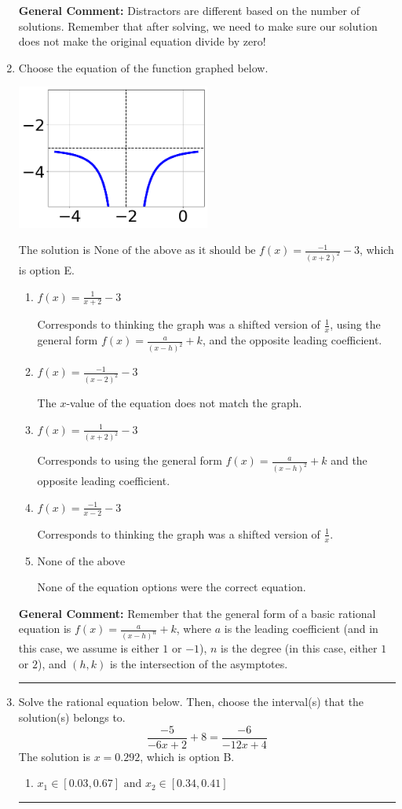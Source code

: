 \documentclass{extbook}[14pt]
\newcommand{\litem}[1]{\item #1

\rule{\textwidth}{0.4pt}}
\begin{document}
\begin{enumerate}
{\textbf{General Comment:} Distractors are different based on the number of solutions. Remember that after solving, we need to make sure our solution does not make the original equation divide by zero!
}
\litem{
Choose the equation of the function graphed below.

\begin{center}
    \includegraphics[width=0.5\textwidth]{../Figures/rationalGraphToEquationCopyC.png}
\end{center}


The solution is \( \text{None of the above as it should be } f(x) = \frac{-1}{(x + 2)^2} - 3 \), which is option E.\begin{enumerate}[label=\Alph*.]
\item \( f(x) = \frac{1}{x + 2} - 3 \)

Corresponds to thinking the graph was a shifted version of $\frac{1}{x}$, using the general form $f(x) = \frac{a}{(x-h)^2}+k$, and the opposite leading coefficient.
\item \( f(x) = \frac{-1}{(x - 2)^2} - 3 \)

The $x$-value of the equation does not match the graph.
\item \( f(x) = \frac{1}{(x + 2)^2} - 3 \)

Corresponds to using the general form $f(x) = \frac{a}{(x-h)^2}+k$ and the opposite leading coefficient.
\item \( f(x) = \frac{-1}{x - 2} - 3 \)

Corresponds to thinking the graph was a shifted version of $\frac{1}{x}$.
\item \( \text{None of the above} \)

None of the equation options were the correct equation.
\end{enumerate}

\textbf{General Comment:} Remember that the general form of a basic rational equation is $ f(x) = \frac{a}{(x-h)^n} + k$, where $a$ is the leading coefficient (and in this case, we assume is either $1$ or $-1$), $n$ is the degree (in this case, either $1$ or $2$), and $(h, k)$ is the intersection of the asymptotes.
}
\litem{
Solve the rational equation below. Then, choose the interval(s) that the solution(s) belongs to.
\[ \frac{-5}{-6x + 2} + 8 = \frac{-6}{-12x + 4} \]The solution is \( x = 0.292 \), which is option B.\begin{enumerate}[label=\Alph*.]
\item \( x_1 \in [0.03, 0.67] \text{ and } x_2 \in [0.34,0.41] \)


\end{enumerate}}
\end{enumerate}
\end{document}
